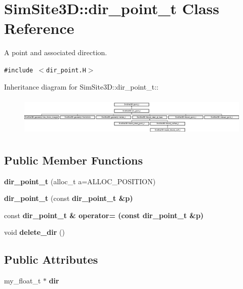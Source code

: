 \section{SimSite3D::dir\_\-point\_\-t Class Reference}
\label{classSimSite3D_1_1dir__point__t}
A point and associated direction.  


{\tt \#include $<$dir\_\-point.H$>$}

Inheritance diagram for SimSite3D::dir\_\-point\_\-t::\begin{figure}[H]
\begin{center}
\leavevmode
\includegraphics[height=1.92044cm]{classSimSite3D_1_1dir__point__t}
\end{center}
\end{figure}
\subsection*{Public Member Functions}
\begin{CompactItemize}
\item 
\textbf{dir\_\-point\_\-t} (alloc\_\-t a=ALLOC\_\-POSITION)\label{classSimSite3D_1_1dir__point__t_57018723a8991fa7f47cc485ba6f3d86}

\item 
\textbf{dir\_\-point\_\-t} (const \bf{dir\_\-point\_\-t} \&p)\label{classSimSite3D_1_1dir__point__t_3931e2347f2aee30a6d72ccdb211c7bb}

\item 
const \bf{dir\_\-point\_\-t} \& \textbf{operator=} (const \bf{dir\_\-point\_\-t} \&p)\label{classSimSite3D_1_1dir__point__t_b45b7d7b83e413955ac14b3ccf2336c4}

\item 
void \textbf{delete\_\-dir} ()\label{classSimSite3D_1_1dir__point__t_dfb4e224f9037f3e14101f5098d5a6c8}

\end{CompactItemize}
\subsection*{Public Attributes}
\begin{CompactItemize}
\item 
my\_\-float\_\-t $\ast$ \textbf{dir}\label{classSimSite3D_1_1dir__point__t_7378ba825067f07353f214941ca4a715}

\end{CompactItemize}
